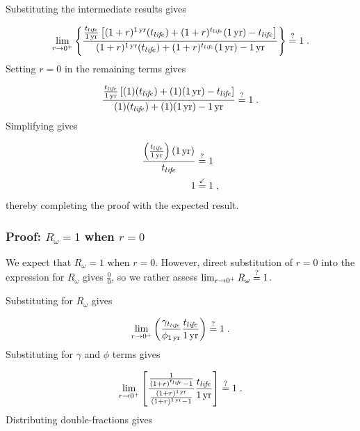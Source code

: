 Substituting the intermediate results gives

\begin{equation}
  \lim_{r \to 0^+} \left\{
                         \frac{\frac{\tlife}{\oneyr}
                         \left[ (1 + r)^{\oneyr} (\tlife) + 
                         (1 + r)^{\tlife} (\oneyr) - 
                         \tlife \right]}
                        {(1 + r)^{\oneyr} (\tlife) + 
                         (1 + r)^{\tlife} (\oneyr) - 
                         \oneyr}
                    \right\} \questionequal 1 \; .
\end{equation}
%
Setting $r = 0$ in the remaining terms gives

\begin{equation}
  \frac{\frac{\tlife}{\oneyr}
              \left[ (1) (\tlife) + 
                     (1) (\oneyr) - 
                     \tlife
              \right]}
       {(1) (\tlife) + 
        (1) (\oneyr) - 
        \oneyr} \questionequal 1 \; .
\end{equation}
%
Simplifying gives

\begin{align}
  \frac{\left( \frac{t_{li\!f\!e}}{1\,\mathrm{yr}} \right) (1\,\mathrm{yr})}{t_{li\!f\!e}} &\stackrel{?}{=} 1 \\
  1 &\stackrel{\checkmark}{=} 1 \; ,
\end{align}
%
thereby completing the proof with the expected result. 



\subsubsection{Proof: $R_\omega = 1$ when $r = 0$}
\label{sec:proof_R_omega}

We expect that $R_\omega = 1$ when $r = 0$.
However, direct substitution of $r = 0$ into the expression
for $R_\omega$ gives $\frac{0}{0}$, 
so we rather assess
$\lim_{r \to 0^+} R_\omega \stackrel{?}{=} 1$.

Substituting for $R_\omega$ gives

\begin{equation}
  \lim_{r \to 0^+} \left( \frac{\gamma_{t_{li\!f\!e}}}{\phi_{1\,\mathrm{yr}}} \frac{t_{li\!f\!e}}{1\,\mathrm{yr}} \right) \stackrel{?}{=} 1 \; .
\end{equation}
%
Substituting for $\gamma$ and $\phi$ terms gives

\begin{equation}
  \lim_{r \to 0^+} \left[ \frac{\frac{1}{(1 + r)^{t_{li\!f\!e}} - 1}}{\frac{(1 + r)^{1\,\mathrm{yr}}}{(1 + r)^{1\,\mathrm{yr}} - 1}} \frac{t_{li\!f\!e}}{1\,\mathrm{yr}} \right] \stackrel{?}{=} 1 \; .
\end{equation}
%
Distributing double-fractions gives

